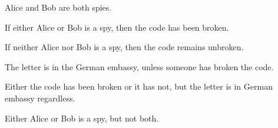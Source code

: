 \problempart
\label{pr.spies}
\begin{earg}
\item Alice and Bob are both spies.
\item[] 
\item If either Alice or Bob is a spy, then the code has been broken.
\item[] 
\item If neither Alice nor Bob is a spy, then the code remains unbroken.
\item[] 
\item The letter is in the German embassy, unless someone has broken the code.
\item[] 
\item Either the code has been broken or it has not, but the letter is in German embassy regardless.
\item[] 
\item Either Alice or Bob is a spy, but not both.
\item[] 
\end{earg}



